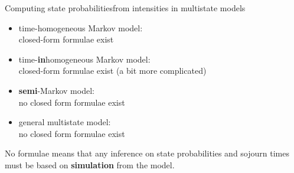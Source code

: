 \begin{frame}{Computing state probabilities\newline from intensities in multistate models}
  \begin{itemize}
  \item time-homogeneous Markov model:\\closed-form formulae exist 
  \item time-\textbf{in}homogeneous Markov model:\\closed-form
    formulae exist (a bit more complicated)
  \item \textbf{semi}-Markov model:\\no closed form formulae exist  
  \item general multistate model:\\no closed form formulae exist  
  \end{itemize}
  \pause
  No formulae means that any inference on state probabilities and sojourn
  times must be based on \textbf{simulation} from the model.
\end{frame}


